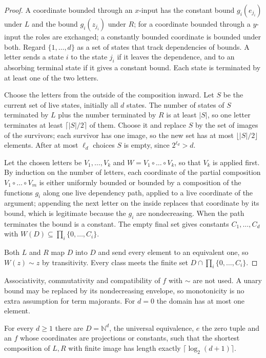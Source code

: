 \begin{proof}
A coordinate bounded through an $x$-input has the constant bound
$g_i(e_{j_i})$ under $L$ and the bound $g_i(z_{j_i})$ under $R$; for a
coordinate bounded through a $y$-input the roles are exchanged; a constantly
bounded coordinate is bounded under both. Regard $\{1,\dots,d\}$ as a set of
states that track dependencies of bounds. A letter sends a state $i$ to the
state $j_i$ if it leaves the dependence, and to an absorbing terminal state if
it gives a constant bound. Each state is terminated by at least one of the two
letters.

Choose the letters from the outside of the composition inward. Let $S$ be the
current set of live states, initially all $d$ states. The number of states of
$S$ terminated by $L$ plus the number terminated by $R$ is at least $|S|$, so
one letter terminates at least $\lceil|S|/2\rceil$ of them. Choose it and
replace $S$ by the set of images of the survivors; each survivor has one
image, so the new set has at most $\lfloor|S|/2\rfloor$ elements. After at most
$\ell_d$ choices $S$ is empty, since $2^{\ell_d}>d$.

Let the chosen letters be $V_1,\dots,V_k$ and $W=V_1\circ\dots\circ V_k$, so
that $V_k$ is applied first. By induction on the number of letters, each
coordinate of the partial composition $V_1\circ\dots\circ V_m$ is either
uniformly bounded or bounded by a composition of the functions $g_i$ along one
live dependency path, applied to a live coordinate of the argument; appending
the next letter on the inside replaces that coordinate by its bound, which is
legitimate because the $g_i$ are nondecreasing. When the path terminates the
bound is a constant. The empty final set gives constants $C_1,\dots,C_d$ with
$W(D)\subseteq\prod_i\{0,\dots,C_i\}$.

Both $L$ and $R$ map $D$ into $D$ and send every element to an equivalent one,
so $W(z)\sim z$ by transitivity. Every class meets the finite set
$D\cap\prod_i\{0,\dots,C_i\}$.
\end{proof}

Associativity, commutativity and compatibility of $f$ with $\sim$ are not
used. A unary bound may be replaced by its nondecreasing envelope, so
monotonicity is no extra assumption for term majorants. For $d=0$ the domain
has at most one element.

\begin{proposition}
\label{obs:prop:sharp}
For every $d\ge 1$ there are $D=\mathbb{N}^d$, the universal equivalence, $e$
the zero tuple and an $f$ whose coordinates are projections or constants, such
that the shortest composition of $L,R$ with finite image has length exactly
$\lceil\log_2(d+1)\rceil$.
\end{proposition}

